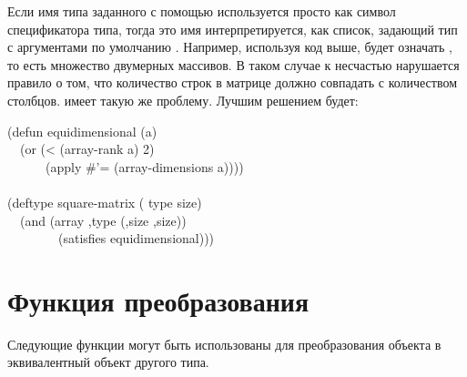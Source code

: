 \begin{defmac}
Если имя типа заданного с помощью  используется просто как символ
спецификатора типа, тогда это имя интерпретируется, как список, задающий тип с
аргументами по умолчанию \cdf{*}. Например, используя код выше,
 будет означать , то есть множество двумерных
массивов.
В таком случае к несчастью нарушается правило о том, что количество строк в
матрице должно совпадать с количеством столбцов.  имеет
такую же проблему.
Лучшим решением будет:
\begin{lisp}
(defun equidimensional (a) \\
~~(or (< (array-rank a) 2) \\
~~~~~~(apply \#'= (array-dimensions a)))) \\
 \\
(deftype square-matrix ( type size) \\
~~{\Xbq}(and (array ,type (,size ,size)) \\
~~~~~~~~(satisfies equidimensional)))
\end{lisp}
\end{defmac}

\section{Функция преобразования}

Следующие функции могут быть использованы для преобразования объекта в
эквивалентный объект другого типа.

